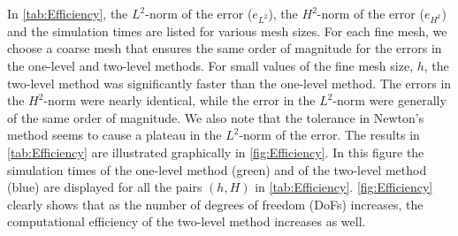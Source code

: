 In \autoref{tab:Efficiency}, the $L^2$-norm of the error ($e_{L^2}$), the
$H^2$-norm of the error ($e_{H^2}$) and the simulation times are listed for
various mesh sizes. For each fine mesh, we choose a coarse mesh that ensures the
same order of magnitude for the errors in the one-level and two-level methods.
For small values of the fine mesh size, $h$, the two-level method was
significantly faster than the one-level method. The errors in the $H^2$-norm
were nearly identical, while the error in the $L^2$-norm were generally of the
same order of magnitude. We also note that the tolerance in Newton's method
seems to cause a plateau in the $L^2$-norm of the error. The results in
\autoref{tab:Efficiency} are illustrated graphically in
\autoref{fig:Efficiency}. In this figure the simulation times of the one-level
method (green) and of the two-level method (blue) are displayed for all the
pairs $(h,H)$ in \autoref{tab:Efficiency}.  \autoref{fig:Efficiency} clearly
shows that as the number of degrees of freedom (DoFs) increases, the
computational efficiency of the two-level method increases as well.


